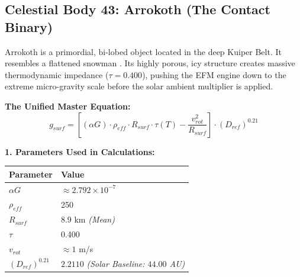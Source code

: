 \documentclass[11pt, a4paper]{article}
\begin{document}
\clearpage
\subsection{Celestial Body 43: Arrokoth (The Contact Binary)}
  Arrokoth is a primordial, bi-lobed object located in the deep Kuiper Belt. It resembles a flattened snowman \cite{stern2019}. Its highly porous, icy structure creates massive thermodynamic impedance ($\tau = 0.400$), pushing the EFM engine down to the extreme micro-gravity scale before the solar ambient multiplier is applied.

  \vspace{0.5em}
  \noindent \textbf{The Unified Master Equation:}
  $$ g_{surf} = \left[ (\alpha G) \cdot \rho_{eff} \cdot R_{surf} \cdot \tau(T) - \frac{v_{rot}^2}{R_{surf}} \right] \cdot (D_{ref})^{0.21} $$

  \vspace{0.5em}
  \noindent \textbf{1. Parameters Used in Calculations:} \\[0.5em]
  \begingroup
  \renewcommand{\arraystretch}{1.3}
  \hspace*{2em}
  \begin{tabular}{|l|l|}
    \hline
    \textbf{Parameter} & \textbf{Value} \\ \hline
    $\alpha G$ & $\approx 2.792 \times 10^{-7}$ \\ \hline
    $\rho_{eff}$ & 250 \\ \hline
    $R_{surf}$ & 8.9 km \textit{(Mean)} \\ \hline
    $\tau$ & 0.400 \\ \hline
    $v_{rot}$ & $\approx 1$ m/s \\ \hline
    $(D_{ref})^{0.21}$ & $2.2110$ \textit{(Solar Baseline: $44.00$ AU)} \\ \hline
  \end{tabular}
  \endgroup
\end{document}
